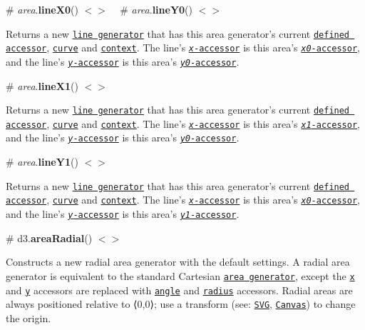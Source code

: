\label{_area_lineX0}%
\# {\itshape area}.{\bfseries line\+X0}() \href{https://github.com/d3/d3-shape/blob/master/src/area.js#L83}{\tt $<$$>$} ~\newline
\label{_area_lineY0}%
\# {\itshape area}.{\bfseries line\+Y0}() \href{https://github.com/d3/d3-shape/blob/master/src/area.js#L84}{\tt $<$$>$}

Returns a new \href{#lines}{\tt line generator} that has this area generator’s current \href{#area_defined}{\tt defined accessor}, \href{#area_curve}{\tt curve} and \href{#area_context}{\tt context}. The line’s \href{#line_x}{\tt {\itshape x}-\/accessor} is this area’s \href{#area_x0}{\tt {\itshape x0}-\/accessor}, and the line’s \href{#line_y}{\tt {\itshape y}-\/accessor} is this area’s \href{#area_y0}{\tt {\itshape y0}-\/accessor}.

\label{_area_lineX1}%
\# {\itshape area}.{\bfseries line\+X1}() \href{https://github.com/d3/d3-shape/blob/master/src/area.js#L92}{\tt $<$$>$}

Returns a new \href{#lines}{\tt line generator} that has this area generator’s current \href{#area_defined}{\tt defined accessor}, \href{#area_curve}{\tt curve} and \href{#area_context}{\tt context}. The line’s \href{#line_x}{\tt {\itshape x}-\/accessor} is this area’s \href{#area_x1}{\tt {\itshape x1}-\/accessor}, and the line’s \href{#line_y}{\tt {\itshape y}-\/accessor} is this area’s \href{#area_y0}{\tt {\itshape y0}-\/accessor}.

\label{_area_lineY1}%
\# {\itshape area}.{\bfseries line\+Y1}() \href{https://github.com/d3/d3-shape/blob/master/src/area.js#L88}{\tt $<$$>$}

Returns a new \href{#lines}{\tt line generator} that has this area generator’s current \href{#area_defined}{\tt defined accessor}, \href{#area_curve}{\tt curve} and \href{#area_context}{\tt context}. The line’s \href{#line_x}{\tt {\itshape x}-\/accessor} is this area’s \href{#area_x0}{\tt {\itshape x0}-\/accessor}, and the line’s \href{#line_y}{\tt {\itshape y}-\/accessor} is this area’s \href{#area_y1}{\tt {\itshape y1}-\/accessor}.

\label{_areaRadial}%
\# d3.{\bfseries area\+Radial}() \href{https://github.com/d3/d3-shape/blob/master/src/areaRadial.js}{\tt $<$$>$}



Constructs a new radial area generator with the default settings. A radial area generator is equivalent to the standard Cartesian \href{#area}{\tt area generator}, except the \href{#area_x}{\tt x} and \href{#area_y}{\tt y} accessors are replaced with \href{#areaRadial_angle}{\tt angle} and \href{#areaRadial_radius}{\tt radius} accessors. Radial areas are always positioned relative to ⟨0,0⟩; use a transform (see\+: \href{http://www.w3.org/TR/SVG/coords.html#TransformAttribute}{\tt S\+VG}, \href{http://www.w3.org/TR/2dcontext/#transformations}{\tt Canvas}) to change the origin.

